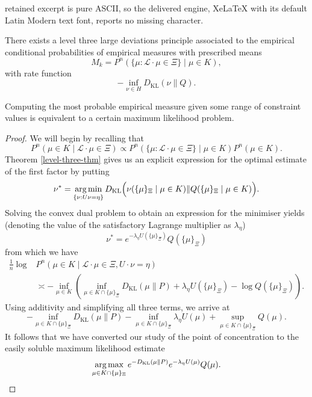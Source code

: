 \documentclass[10pt,a4paper]{amsart}
\DeclareMathOperator*{\argmax}{\text{arg\,max}}
\DeclareMathOperator*{\argmin}{\text{arg\,min}}
\newcommand{\lag}{\mathcal{L}}
\begin{document}
retained excerpt is pure ASCII, so the delivered engine, XeLaTeX with its default Latin Modern text font, reports no missing character.
\begin{theorem}\label{level-three-thm}
    There exists a level three large deviations principle associated to the empirical conditional probabilities of empirical measures with prescribed means 
    \[
        M_k = P^n(\{\mu : \lag\cdot\mu \in \Xi\} \mid \mu \in K),
    \]
    with rate function 
    \[
        -\inf_{\nu \in H} D_{\mathrm{KL}}(\nu \| Q).
    \]
\end{theorem}

\begin{theorem}\label{max-likelihood-thm}
    Computing the most probable empirical measure given some range of constraint values is equivalent to a certain maximum likelihood problem.
\end{theorem}

\begin{proof}
    We will begin by recalling that
    \[
        P^n(\mu \in K \mid \lag\cdot\mu \in \Xi) \propto P^n(\{\mu : \lag\cdot\mu \in \Xi\} \mid \mu \in K) P^n(\mu \in K).
    \]
    Theorem \ref{level-three-thm} gives us an explicit expression for the optimal estimate of the first factor by putting
    \[
        \nu^* = \argmin_{\{\nu : U\nu = \eta\}} D_{\mathrm{KL}}\Big(\nu(\{\mu\}_\Xi \mid \mu \in K) \| Q(\{\mu\}_\Xi \mid \mu \in K)\Big).
    \]
    Solving the convex dual problem to obtain an expression for the minimiser yields (denoting the value of the satisfactory Lagrange multiplier as $\lambda_\eta$)
    \[
        \nu^* = e^{-\lambda_\eta U(\{\mu\}_\Xi)}Q(\{\mu\}_\Xi)
    \]
    from which we have 
    \begin{align*}
        \frac{1}{n}\log &P^n(\mu \in K \mid \lag \cdot \mu \in \Xi, U\cdot \nu = \eta) \\ &\asymp -\inf_{\mu \in K}\left(\inf_{\mu \in K \cap \{\mu\}_\Xi}D_{\mathrm{KL}}(\mu \| P) + %
        \lambda_\eta U(\{\mu\}_\Xi) - \log Q(\{\mu\}_\Xi) \right).
    \end{align*}
    Using additivity and simplifying all three terms, we arrive at
    \[
        -\inf_{\mu \in K \cap \{\mu\}_\Xi} D_{\mathrm{KL}}(\mu \| P) -\inf_{\mu \in K \cap \{\mu\}_\Xi}\lambda_\eta U(\mu) + \sup_{\mu \in K \cap \{\mu\}_\Xi} Q(\mu).
    \]
    It follows that we have converted our study of the point of concentration to the easily soluble maximum likelihood estimate
    \begin{equation}\label{max-likelihood-eq}
        \argmax_{\mu \in K \cap \{\mu\}_\Xi} e^{- D_{\mathrm{KL}}(\mu \| P)} e^{-\lambda_\eta U(\mu)}Q(\mu).
    \end{equation}
\end{proof}
\end{document}
